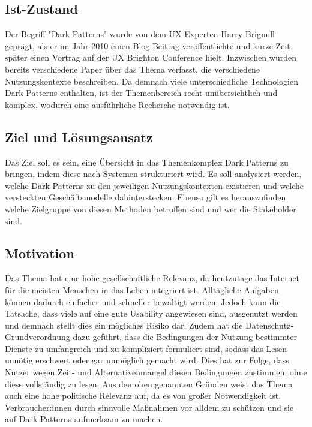 \documentclass[a4paper]{article}
\begin{document}
\subsection{Ist-Zustand}
\label{sub:ist-zustand}
Der Begriff "Dark Patterns" wurde von dem UX-Experten Harry Brignull geprägt, als er im Jahr 2010 einen Blog-Beitrag veröffentlichte \cite{brignull1} und kurze Zeit später einen Vortrag auf der UX Brighton Conference hielt. Inzwischen wurden bereits verschiedene Paper über das Thema verfasst, die verschiedene Nutzungskontexte beschreiben. Da demnach viele unterschiedliche Technologien Dark Patterns enthalten, ist der Themenbereich recht unübersichtlich und komplex, wodurch eine ausführliche Recherche notwendig ist.

\subsection{Ziel und Lösungsansatz}
\label{sub:ziel_und_loesungsansatz}
Das Ziel soll es sein, eine Übersicht in das Themenkomplex Dark Patterns zu bringen, indem diese nach Systemen strukturiert wird. Es soll analysiert werden, welche Dark Patterns zu den jeweiligen Nutzungskontexten existieren und welche versteckten Geschäftsmodelle dahinterstecken. Ebenso gilt es herauszufinden, welche Zielgruppe von diesen Methoden betroffen sind und wer die Stakeholder sind. 

\subsection{Motivation}
\label{motivation}
Das Thema hat eine hohe gesellschaftliche Relevanz, da heutzutage das Internet für die meisten Menschen in das Leben integriert ist. Alltägliche Aufgaben können dadurch einfacher und schneller bewältigt werden. Jedoch kann die Tatsache, dass viele auf eine gute Usability angewiesen sind, ausgenutzt werden und demnach stellt dies ein mögliches Risiko dar. 
Zudem hat die Datenschutz-Grundverordnung dazu geführt, dass die Bedingungen der Nutzung bestimmter Dienste zu umfangreich und zu kompliziert formuliert sind, sodass das Lesen unnötig erschwert oder gar unmöglich gemacht wird. Dies hat zur Folge, dass Nutzer wegen Zeit- und Alternativenmangel diesen Bedingungen zustimmen, ohne diese vollständig zu lesen.  
Aus den oben genannten Gründen weist das Thema auch eine hohe politische Relevanz auf, da es von großer Notwendigkeit ist, Verbraucher:innen durch sinnvolle Maßnahmen vor alldem zu schützen und sie auf Dark Patterns aufmerksam zu machen.
\end{document}
